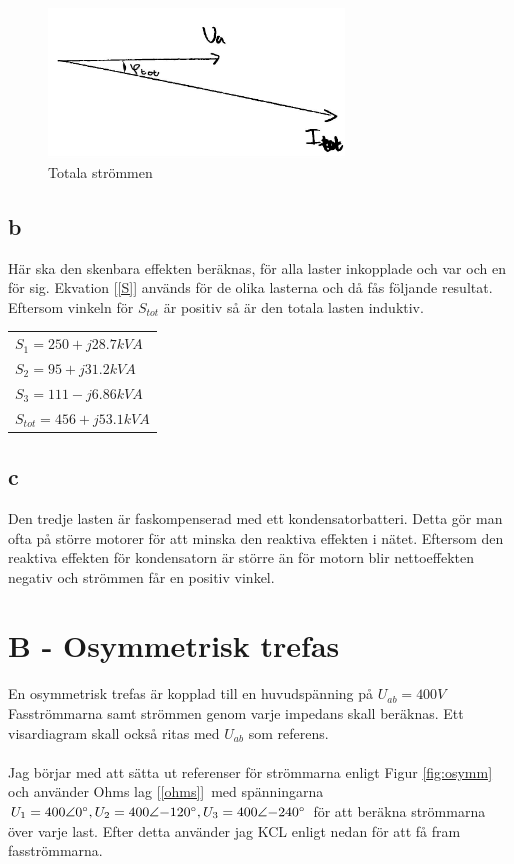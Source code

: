 \documentclass{article}
\begin{document}
  \begin{figure}[H]
  \begin{center}
  \includegraphics[width=0.7\textwidth]{img/Itot.jpg} %
  \caption{Totala strömmen}
  \end{center}
  \end{figure}

\subsection{b}
  Här ska den skenbara effekten beräknas, för alla laster inkopplade och var och en för sig.
  Ekvation [\ref{S}] används för de olika lasterna och då fås följande resultat.
  Eftersom vinkeln för $S_{tot}$ är positiv så är den totala lasten induktiv.

  \begin{tabular}{l}
      $S_1=250 + j28.7 kVA$ \\
      $S_2=95+ j31.2 kVA$ \\
      $S_3 = 111 -  j6.86 kVA$\\
      $S_{tot}=456 + j53.1 kVA$
  \end{tabular}

\subsection{c}
Den tredje lasten är faskompenserad med ett kondensatorbatteri.
Detta gör man ofta på större motorer för att minska den reaktiva effekten i nätet.
Eftersom den reaktiva effekten för kondensatorn är större än för motorn blir nettoeffekten negativ och strömmen får en positiv vinkel.


\section{B - Osymmetrisk trefas}
  En osymmetrisk trefas är kopplad till en huvudspänning på $U_{ab}=400V$
  Fasströmmarna samt strömmen genom varje impedans skall beräknas.
  Ett visardiagram skall också ritas med $U_{ab}$ som referens.
  \\
  \\
  Jag börjar med att sätta ut referenser för strömmarna enligt Figur \ref{fig:osymm} och använder Ohms lag [\ref{ohms}]\
   med spänningarna $U_1=400\angle{0\degree},U_2=400\angle{-120\degree},U_3=400\angle{-240\degree}$ för att beräkna strömmarna över varje last.
  Efter detta använder jag KCL enligt nedan för att få fram fasströmmarna.
\end{document}
